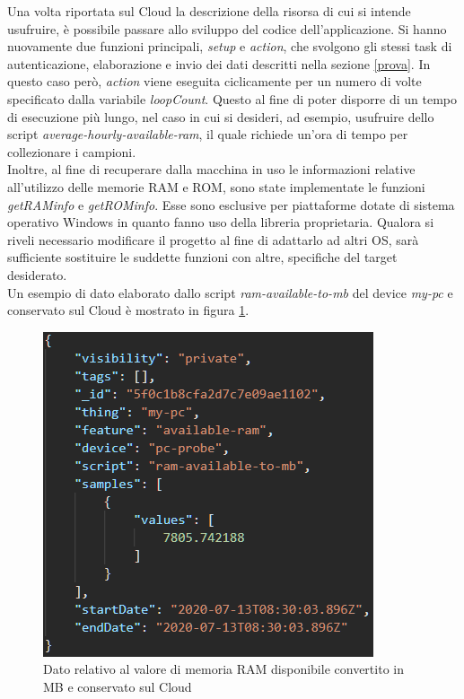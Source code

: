 Una volta riportata sul Cloud la descrizione della risorsa di cui si intende usufruire, è possibile passare allo sviluppo del codice dell'applicazione. Si hanno nuovamente due funzioni principali, \textit{setup} e \textit{action}, che svolgono gli stessi task di autenticazione, elaborazione e invio dei dati descritti nella sezione \ref{prova}. In questo caso però, \textit{action} viene eseguita ciclicamente per un numero di volte specificato dalla variabile \textit{loopCount}. Questo al fine di poter disporre di un tempo di esecuzione più lungo, nel caso in cui si desideri, ad esempio, usufruire dello script \textit{average-hourly-available-ram}, il quale richiede un'ora di tempo per collezionare i campioni.\\
Inoltre, al fine di recuperare dalla macchina in uso le informazioni relative all'utilizzo delle memorie RAM e ROM, sono state implementate le funzioni \textit{getRAMinfo} e  \textit{getROMinfo}. Esse sono esclusive per piattaforme dotate di sistema operativo Windows in quanto fanno uso della libreria proprietaria. Qualora si riveli necessario modificare il progetto al fine di adattarlo ad altri OS, sarà sufficiente sostituire le suddette funzioni con altre, specifiche del target desiderato.\\
Un esempio di dato elaborato dallo script \textit{ram-available-to-mb} del device \textit{my-pc} e conservato sul Cloud è mostrato in figura \ref{datowin}.
\begin{figure}[H]
	\centering
	\includegraphics[scale=0.7]{pics/datowin}
	\caption{Dato relativo al valore di memoria RAM disponibile convertito in MB e conservato sul Cloud}
	\label{datowin}
\end{figure}
